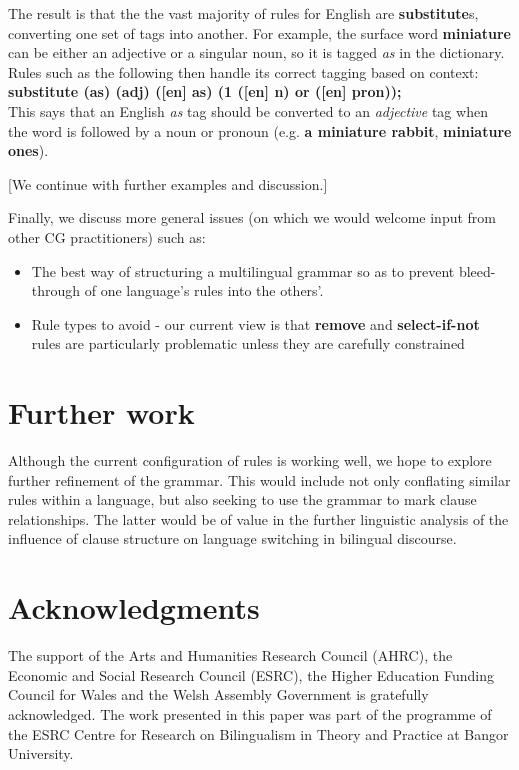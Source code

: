 \documentclass[11pt]{article}
\begin{document}
The result is that the the vast majority of rules for English are \textbf{substitute}s, converting one set of tags into another.  For example, the surface word \textbf{miniature} can be either an adjective or a singular noun, so it is tagged \textit{as} in the dictionary.  Rules such as the following then handle its correct tagging based on context:\\
\indent\textbf{substitute (as) (adj) ([en] as) (1 ([en] n) or ([en] pron));}\\
This says that an English \textit{as} tag should be converted to an \textit{adjective} tag when the word is followed by a noun or pronoun (e.g. \textbf{a miniature rabbit}, \textbf{miniature ones}).

[We continue with further examples and discussion.]

Finally, we discuss more general issues (on which we would welcome input from other CG practitioners) such as:
\begin{itemize}
\item The best way of structuring a multilingual grammar so as to prevent bleed-through of one language's rules into the others'.
\item Rule types to avoid - our current view is that \textbf{remove} and \textbf{select-if-not} rules are particularly problematic unless they are carefully constrained
\end{itemize}

\section{Further work}
\label{sec:further}

Although the current configuration of rules is working well, we hope to explore further refinement of the grammar.  This would include not only conflating similar rules within a language, but also seeking to use the grammar to mark clause relationships.  The latter would be of value in the further linguistic analysis of the influence of clause structure on language switching in bilingual discourse.


\section*{Acknowledgments}

The support of the Arts and Humanities Research Council (AHRC), the Economic and Social Research Council (ESRC), the Higher Education Funding Council for Wales and the Welsh Assembly Government is gratefully acknowledged. The work presented in this paper was part of the programme of the ESRC Centre for Research on Bilingualism in Theory and Practice at Bangor University.




\end{document}
